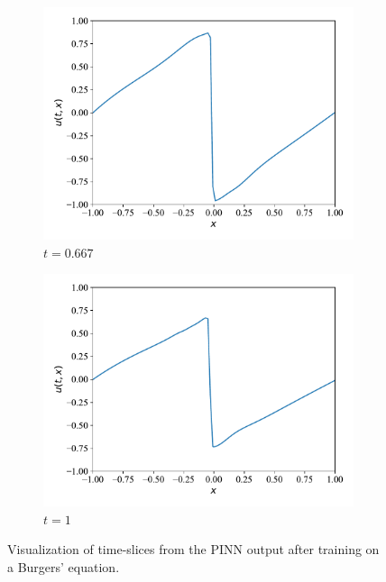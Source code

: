 \begin{figure}[H]
     \begin{subfigure}[b]{0.45\textwidth}
         \centering
         \includegraphics[width=\textwidth]{Figures/InitialExperiments/burger_slice3.pdf}
         \caption{$t = 0.667$}
         \label{fig:burger_slice3}
     \end{subfigure}
     \hfill
     \begin{subfigure}[b]{0.45\textwidth}
         \centering
         \includegraphics[width=\textwidth]{Figures/InitialExperiments/burger_slice4.pdf}
         \caption{$t = 1$}
         \label{fig:burger_slice4}
     \end{subfigure}
    \caption{Visualization of time-slices from the PINN output after training on a Burgers' equation.}
    \label{fig:burger_slice}
\end{figure}

